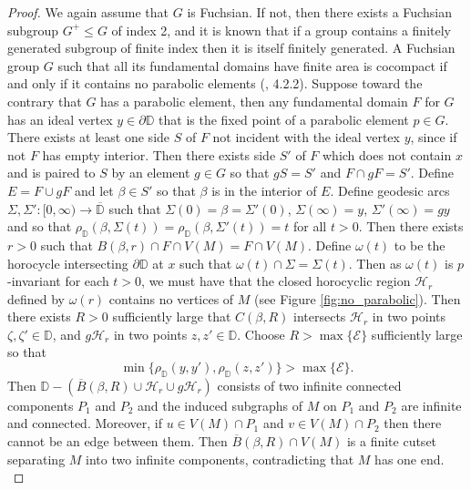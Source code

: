 \documentclass{article}
\numberwithin{equation}{section}
\theoremstyle{definition}
\theoremstyle{remark}
\begin{document}
\begin{proof}
We again assume that $G$ is Fuchsian. If not, then there exists a Fuchsian subgroup $G^+\leq G$ of index 2, and it is known that if a group contains a finitely generated subgroup of finite index then it is itself finitely generated.
  A Fuchsian group $G$ such that all its fundamental domains have finite area is cocompact if and only if it contains no parabolic elements (\cite{Fuchsian_Katok}, 4.2.2). Suppose toward the contrary that $G$ has a parabolic element, then any fundamental domain $F$ for $G$ has an ideal vertex $y\in\partial \mathbb{D}$ that is the fixed point of a parabolic element $p\in G$. 
There exists at least one side $S$ of $F$ not incident with the ideal vertex $y$, since if not $F$ has empty interior. Then there exists side $S'$ of $F$ which does not contain $x$ and is paired to $S$ by an element $g\in G$ so that $gS=S'$ and $F\cap gF=S'$. Define $E=F\cup gF$ and let $\beta\in S'$ so that $\beta$ is in the interior of $E$. Define geodesic arcs $\Sigma,\Sigma':[0,\infty)\rightarrow \overline{\mathbb{D}}$ such that $\Sigma(0)=\beta=\Sigma'(0)$, $\Sigma(\infty)=y$, $\Sigma'(\infty)=gy$ and so that $\rho_\mathbb{D}(\beta,\Sigma(t))=\rho_\mathbb{D}(\beta,\Sigma'(t))=t$ for all $t>0$.
 Then there exists $r>0$ such that $B(\beta,r)\cap F\cap V(M)=F\cap V(M)$. 
  Define $\omega(t)$ to be the horocycle intersecting $\partial\mathbb{D}$ at $x$ such that $\omega(t)\cap\Sigma=\Sigma(t)$. Then as $\omega(t)$ is $p$-invariant for each $t>0$, we must have that the closed horocyclic region $\mathcal{H}_r$ defined by $\omega(r)$ contains no vertices of $M$ (see Figure \ref{fig:no_parabolic}). 
 Then there exists $R>0$ sufficiently large that $C(\beta,R)$ intersects $\mathcal{H}_r$ in two points $\zeta,\zeta'\in\mathbb{D}$, and $g\mathcal{H}_r$ in two points $z,z'\in\mathbb{D}$. Choose $R>\max\{\mathcal{E}\}$ sufficiently large so that 
  $$\min\{\rho_\mathbb{D}(y,y'),\rho_\mathbb{D}(z,z')\}>\max\{\mathcal{E}\}.$$
  Then $\mathbb{D}-(\overline{B}(\beta,R)\cup \mathcal{H}_r\cup g\mathcal{H}_r)$ consists of two infinite connected components $P_1$ and $P_2$ and the induced subgraphs of $M$ on $P_1$ and $P_2$ are infinite and connected. Moreover, if $u\in V(M)\cap P_1$ and $v\in V(M)\cap P_2$ then there cannot be an edge between them. Then $\overline{B}(\beta,R)\cap V(M)$ is a finite cutset separating $M$ into two infinite components, contradicting that $M$ has one end.\\

\end{proof}
\end{document}
